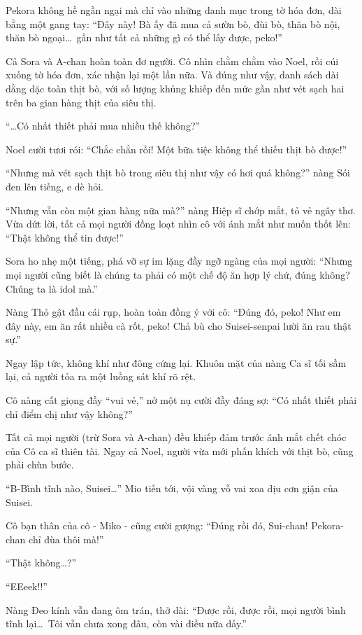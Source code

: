 \documentclass[../main.tex]{subfiles}
\begin{document}
Pekora không hề ngần ngại mà chỉ vào những danh mục trong tờ hóa đơn, dài bằng một gang tay: ``Đây này! Bà ấy đã mua cả sườn bò, đùi bò, thăn bò nội, thăn bò ngoại\dots\ gần như tất cả những gì có thể lấy được, peko!''

Cả Sora và A-chan hoàn toàn đơ người. Cô nhìn chằm chằm vào Noel, rồi cúi xuống tờ hóa đơn, xác nhận lại một lần nữa. Và đúng như vậy, danh sách dài dằng dặc toàn thịt bò, với số lượng khủng khiếp đến mức gần như vét sạch hai trên ba gian hàng thịt của siêu thị.

``\dots Có nhất thiết phải mua nhiều thế không?''

Noel cười tươi rói: ``Chắc chắn rồi! Một bữa tiệc không thể thiếu thịt bò được!''

``Nhưng mà vét sạch thịt bò trong siêu thị như vậy có hơi quá không?'' nàng Sói đen lên tiếng, e dè hỏi.

``Nhưng vẫn còn một gian hàng nữa mà?'' nàng Hiệp sĩ chớp mắt, tỏ vẻ ngây thơ. Vừa dứt lời, tất cả mọi người đồng loạt nhìn cô với ánh mắt như muốn thốt lên: ``Thật không thể tin được!''

Sora ho nhẹ một tiếng, phá vỡ sự im lặng đầy ngỡ ngàng của mọi người: ``Nhưng mọi người cũng biết là chúng ta phải có một chế độ ăn hợp lý chứ, đúng không? Chúng ta là idol mà.''

Nàng Thỏ gật đầu cái rụp, hoàn toàn đồng ý với cô: ``Đúng đó, peko! Như em đây này, em ăn rất nhiều cà rốt, peko! Chả bù cho Suisei-senpai lười ăn rau thật sự.''

Ngay lập tức, không khí như đông cứng lại. Khuôn mặt của nàng Ca sĩ tối sầm lại, cả người tỏa ra một luồng sát khí rõ rệt.

Cô nàng cất giọng đầy ``vui vẻ,'' nở một nụ cười đầy đáng sợ: ``Có nhất thiết phải chỉ điểm chị như vậy không?''

Tất cả mọi người (trừ Sora và A-chan) đều khiếp đảm trước ánh mắt chết chóc của Cô ca sĩ thiên tài. Ngay cả Noel, người vừa mới phấn khích với thịt bò, cũng phải chùn bước.

``B-Bình tĩnh nào, Suisei\dots'' Mio tiến tới, vội vàng vỗ vai xoa dịu cơn giận của Suisei.

Cô bạn thân của cô - Miko - cũng cười gượng: ``Đúng rồi đó, Sui-chan! Pekora-chan chỉ đùa thôi mà!''

``Thật không\dots?''

``EEeek!!''

Nàng Đeo kính vẫn đang ôm trán, thở dài: ``Được rồi, được rồi, mọi người bình tĩnh lại\dots\ Tôi vẫn chưa xong đâu, còn vài điều nữa đấy.''
\end{document}
